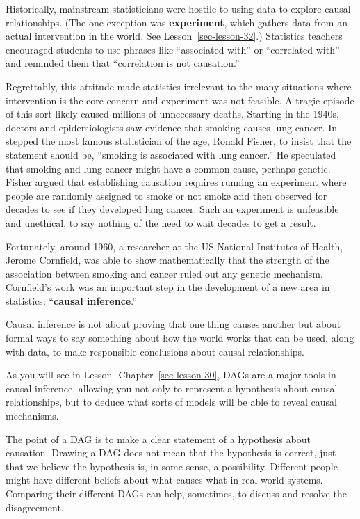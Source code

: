 \documentclass[
  letterpaper,
  DIV=11,
  numbers=noendperiod,
  oneside]{scrreprt}
\begin{document}
Historically, mainstream statisticians were hostile to using data to
explore causal relationships. (The one exception was
\textbf{experiment}, which gathers data from an actual intervention in
the world. See Lesson~\ref{sec-lesson-32}.) Statistics teachers
encouraged students to use phrases like ``associated with'' or
``correlated with'' and reminded them that ``correlation is not
causation.''

Regrettably, this attitude made statistics irrelevant to the many
situations where intervention is the core concern and experiment was not
feasible. A tragic episode of this sort likely caused millions of
unnecessary deaths. Starting in the 1940s, doctors and epidemiologists
saw evidence that smoking causes lung cancer. In stepped the most famous
statistician of the age, Ronald Fisher, to insist that the statement
should be, ``smoking is associated with lung cancer.'' He speculated
that smoking and lung cancer might have a common cause, perhaps genetic.
Fisher argued that establishing causation requires running an experiment
where people are randomly assigned to smoke or not smoke and then
observed for decades to see if they developed lung cancer. Such an
experiment is unfeasible and unethical, to say nothing of the need to
wait decades to get a result.

Fortunately, around 1960, a researcher at the US National Institutes of
Health, Jerome Cornfield, was able to show mathematically that the
strength of the association between smoking and cancer ruled out any
genetic mechanism. Cornfield's work was an important step in the
development of a new area in statistics: ``\textbf{causal inference}.''

Causal inference is not about proving that one thing causes another but
about formal ways to say something about how the world works that can be
used, along with data, to make responsible conclusions about causal
relationships.

As you will see in Lesson -Chapter~\ref{sec-lesson-30}, DAGs are a major
tools in causal inference, allowing you not only to represent a
hypothesis about causal relationships, but to deduce what sorts of
models will be able to reveal causal mechanisms.

The point of a DAG is to make a clear statement of a hypothesis about
causation. Drawing a DAG does not mean that the hypothesis is correct,
just that we believe the hypothesis is, in some sense, a possibility.
Different people might have different beliefs about what causes what in
real-world systems. Comparing their different DAGs can help, sometimes,
to discuss and resolve the disagreement.
\end{document}
